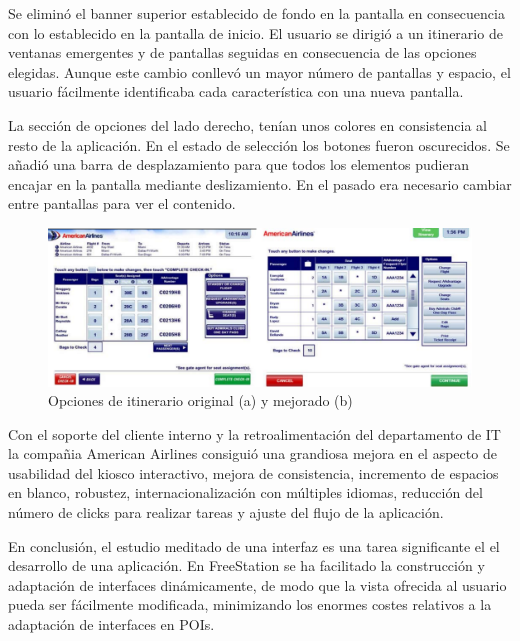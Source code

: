 Se eliminó el banner superior establecido de fondo en la pantalla en
consecuencia con lo establecido en la pantalla de inicio. El usuario se dirigió
a un itinerario de ventanas emergentes y de pantallas seguidas en consecuencia 
de las opciones elegidas. Aunque este cambio conllevó un mayor número de
pantallas y espacio, el usuario fácilmente identificaba cada característica 
con una nueva pantalla.
 
La sección de opciones del lado derecho, tenían unos colores en
consistencia al resto de la aplicación. En el estado de selección los botones
fueron oscurecidos. Se añadió una barra de desplazamiento para que todos los
elementos pudieran encajar en la pantalla mediante deslizamiento. En el 
pasado era necesario cambiar entre pantallas para ver el contenido.

\begin{figure}[ht]
    \begin{center}
        \includegraphics[width=425px]{src/img/american-itinerary.pdf}
        \caption[Opciones de itinerario original (a) y mejorado (b)] 
        {Opciones de itinerario original (a) y mejorado (b)}
        \label{fig:AmericanItinerary}
    \end{center}
\end{figure}

Con el soporte del cliente interno y la retroalimentación del departamento de IT
la compañia American Airlines consiguió una grandiosa mejora en el aspecto de
usabilidad del kiosco interactivo, mejora de consistencia, incremento de
espacios en blanco, robustez, internacionalización con múltiples idiomas, reducción
del número de clicks para realizar tareas y ajuste del flujo de la aplicación.

En conclusión, el estudio meditado de una interfaz es una tarea significante el
el desarrollo de una aplicación. En FreeStation se ha facilitado la construcción
y adaptación de interfaces dinámicamente, de modo que la vista ofrecida al
usuario pueda ser fácilmente modificada, minimizando los enormes costes
relativos a la adaptación de interfaces en POIs.
